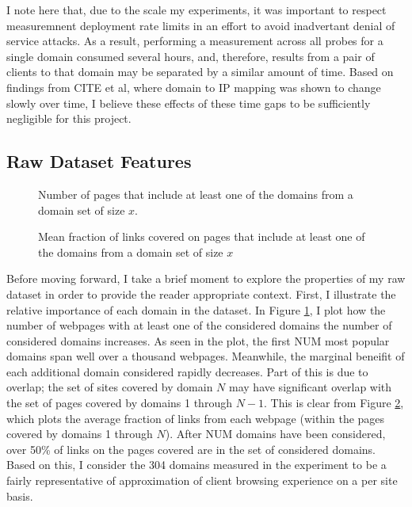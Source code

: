 I note here that, due to the scale my experiments, it was important to respect measuremnent
deployment rate limits in an effort to avoid inadvertant denial of service attacks. As a result,
performing a measurement across all probes for a single domain consumed several hours, and,
therefore, results from a pair of clients to that domain may be separated by a similar amount of
time. Based on findings from CITE et al, where domain to IP mapping was shown to change slowly over
time, I believe these effects of these time gaps to be sufficiently negligible for this project. 

\subsection{Raw Dataset Features}

\begin{figure*}
    \center
            \begin{subfigure}[b]{.7\linewidth}
                \caption{Number of pages that include at least one of the domains from a domain set
                of size $x$.}
                \label{num_pages}
            \end{subfigure}
            \begin{subfigure}[b]{0.7\linewidth}
                \caption{Mean fraction of links covered on pages that include at least one of the
                domains from a domain set of size $x$}
                \label{frac_links}
            \end{subfigure}
\end{figure*}

Before moving forward, I take a brief moment to explore the properties of my raw dataset in order
to provide the reader appropriate context. First, I illustrate the relative importance of each
domain in the dataset. In Figure \ref{num_pages}, I plot how the number of webpages with at least
one of the
considered domains the number of considered domains increases. As seen in the plot, the first
NUM most popular domains span well over a thousand webpages. Meanwhile, the marginal beneifit of
each additional domain considered rapidly decreases. Part of this is due to overlap; the set of
sites covered by domain $N$ may have significant overlap with the set of pages covered by domains 1
through $N-1$. This is clear from Figure \ref{frac_links}, which plots the average fraction of links from each
webpage (within the pages covered by domains 1 through $N$). After NUM domains have been considered,
over 50\% of links on the pages covered are in the set of considered domains. Based on this, I
consider the 304 domains measured in the experiment to be a fairly representative of approximation
of client browsing experience on a per site basis. 

